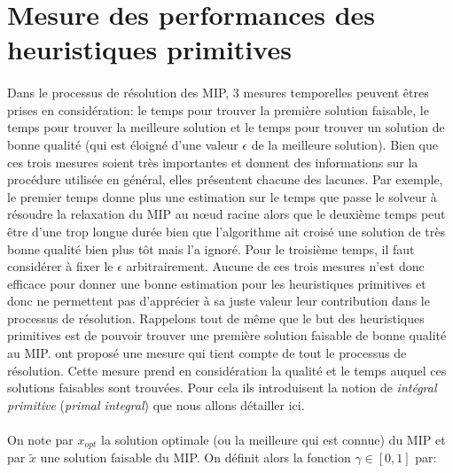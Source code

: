 \documentclass[12pt,a4paper,oneside]{book}
\theoremstyle{definition}
\begin{document}
	
	
	
	\section{Mesure des performances des heuristiques primitives}
	\paragraph{}
	Dans le processus de résolution des MIP, 3 mesures temporelles peuvent êtres prises en considération: le temps pour trouver la première solution faisable, le temps pour trouver la meilleure solution et le temps pour trouver un solution de bonne qualité (qui est éloigné d'une valeur $\epsilon$ de la meilleure solution). Bien que ces trois mesures soient très importantes et donnent des informations sur la procédure utilisée en général, elles présentent chacune des lacunes. Par exemple, le premier temps donne plus une estimation sur le temps que passe le solveur à résoudre la relaxation du MIP au nœud racine alors que le deuxième temps peut être d'une trop longue durée bien que l'algorithme ait croisé une solution de très bonne qualité bien plus tôt mais l'a ignoré. Pour le troisième temps, il faut considérer à fixer le $\epsilon$ arbitrairement. Aucune de ces trois mesures n'est donc efficace pour donner une bonne estimation pour les heuristiques primitives et donc ne permettent pas d'apprécier à sa juste valeur leur contribution dans le processus de résolution. Rappelons tout de même que le but des heuristiques primitives est de pouvoir trouver une première solution faisable de bonne qualité au MIP. \cite{Achterberg2012} ont proposé une mesure qui tient compte de tout le processus de résolution. Cette mesure prend en considération la qualité et le temps auquel ces solutions faisables sont trouvées. Pour cela ils introduisent la notion de \textit{intégral primitive} (\textit{primal integral}) que nous allons détailler ici.
	
	\paragraph{}
	On note par $x_{opt}$ la solution optimale (ou la meilleure qui est connue) du MIP et par $\tilde{x}$ une solution faisable du MIP. On définit alors la fonction $\gamma \in [0,1]$ par:
	
\end{document}
